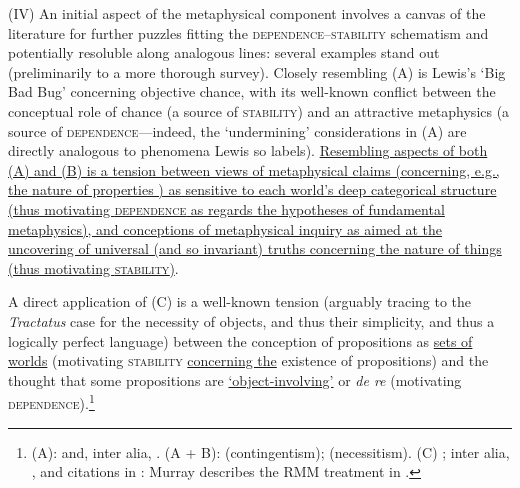 \documentclass[12pt]{article}
\begin{document}
(IV) An initial aspect of the metaphysical component involves a canvas of the
literature for further puzzles fitting the
\textsc{dependence}--\textsc{stability} schematism and potentially
resoluble along analogous lines: several examples stand out (preliminarily to
a more thorough survey). Closely resembling (A) is Lewis's `Big Bad Bug'
concerning objective chance, with its well-known conflict between the
conceptual role of chance (a source of \textsc{stability}) and an attractive
metaphysics (a source of \textsc{dependence}---indeed, the `undermining'
considerations in (A) are directly analogous to phenomena Lewis so labels).
\ul{Resembling aspects of both (A) and (B) is a tension between views of
metaphysical claims (concerning, e.g., the nature of properties ) 
as sensitive to each world's deep categorical structure
(thus motivating \textsc{dependence} as regards the hypotheses of fundamental
metaphysics), and conceptions of 
metaphysical inquiry as aimed at the uncovering of universal (and so invariant) truths
concerning the nature of things (thus motivating \textsc{stability})}.
\begin{comment} 
a recently discovered puzzle for the
logic of counterfactual conditionals involving Chisholm's Paradox-style
`limited tolerance' reasoning.
\end{comment}
A direct application of (C) is a well-known
tension (arguably tracing to the \emph{Tractatus} case for the necessity of
objects, and thus their simplicity, and thus a logically perfect language)
between the conception of propositions as \ul{sets of worlds} (motivating
\textsc{stability} \ul{concerning the} existence of propositions) and the
thought that some propositions are \ul{`object-involving'} or \emph{de re} (motivating
\textsc{dependence}).\footnote{(A):
\citep{lewis80sg,lewis86intro,lewis94debugged} and, inter alia,
\citep{Hall1994-HALCTG,Thau1994-THAUAA,Arntzenius2003-ARNOWW,Loewer2004-LOEDLH,Briggs2009-BRITAO,Pettigrew2013-PETWCN,Caie2015-CAICIT-3}.
(A + B): \citep{Cameron2007-CAMTCO-2,parsons2013-PARCCA-9,
Rosen2006-ROSTLO-2, Miller2009-MILDCI-3} (contingentism);
\citep{Sider1993-SIDVIA,fineem,Fine2011-FINWIM,Schaffer2007-SCHFNT} (necessitism).
(C) \citep[2.02--2.0212]{witttlp};
inter alia, \citep{Prior1967-PRIPPA-2,stalnaker12}, and citations in
\citep{Fritz2016-FRIPC-2}: Murray describes the RMM treatment in
\citep{murray-pdps}.}
\end{document}
